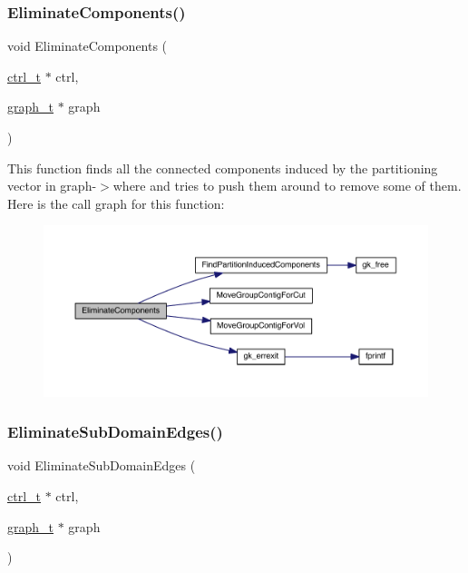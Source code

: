 \subsubsection{\texorpdfstring{Eliminate\+Components()}{EliminateComponents()}}
{\footnotesize\ttfamily void Eliminate\+Components (\begin{DoxyParamCaption}\item[{\hyperlink{a00742}{ctrl\+\_\+t} $\ast$}]{ctrl,  }\item[{\hyperlink{a00734}{graph\+\_\+t} $\ast$}]{graph }\end{DoxyParamCaption})}

This function finds all the connected components induced by the partitioning vector in graph-\/$>$where and tries to push them around to remove some of them. Here is the call graph for this function\+:\nopagebreak
\begin{figure}[H]
\begin{center}
\leavevmode
\includegraphics[width=350pt]{a00945_a002ad59e8624946cc9450cb9b3c10741_cgraph}
\end{center}
\end{figure}
\mbox{\label{a00945_a6dab60a85abb88ada807831e84cb84fc}} 
\subsubsection{\texorpdfstring{Eliminate\+Sub\+Domain\+Edges()}{EliminateSubDomainEdges()}}
{\footnotesize\ttfamily void Eliminate\+Sub\+Domain\+Edges (\begin{DoxyParamCaption}\item[{\hyperlink{a00742}{ctrl\+\_\+t} $\ast$}]{ctrl,  }\item[{\hyperlink{a00734}{graph\+\_\+t} $\ast$}]{graph }\end{DoxyParamCaption})}

